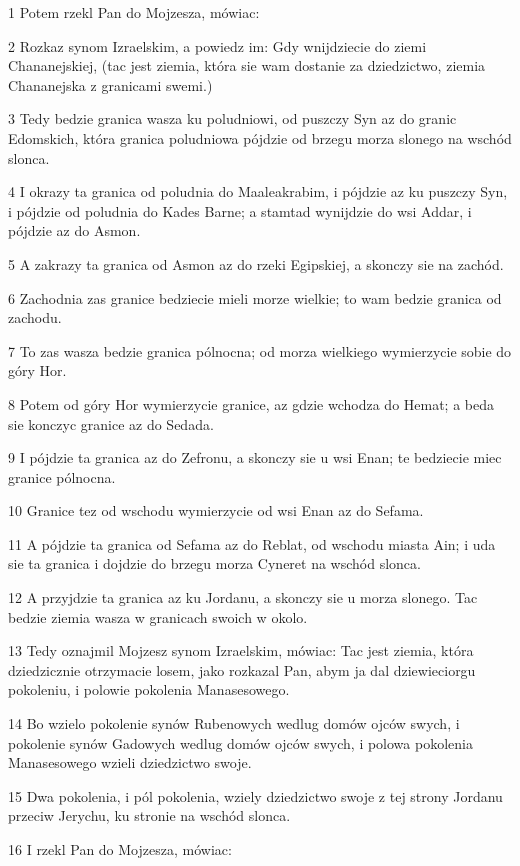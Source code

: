 \par 1 Potem rzekl Pan do Mojzesza, mówiac:
\par 2 Rozkaz synom Izraelskim, a powiedz im: Gdy wnijdziecie do ziemi Chananejskiej, (tac jest ziemia, która sie wam dostanie za dziedzictwo, ziemia Chananejska z granicami swemi.)
\par 3 Tedy bedzie granica wasza ku poludniowi, od puszczy Syn az do granic Edomskich, która granica poludniowa pójdzie od brzegu morza slonego na wschód slonca.
\par 4 I okrazy ta granica od poludnia do Maaleakrabim, i pójdzie az ku puszczy Syn, i pójdzie od poludnia do Kades Barne; a stamtad wynijdzie do wsi Addar, i pójdzie az do Asmon.
\par 5 A zakrazy ta granica od Asmon az do rzeki Egipskiej, a skonczy sie na zachód.
\par 6 Zachodnia zas granice bedziecie mieli morze wielkie; to wam bedzie granica od zachodu.
\par 7 To zas wasza bedzie granica pólnocna; od morza wielkiego wymierzycie sobie do góry Hor.
\par 8 Potem od góry Hor wymierzycie granice, az gdzie wchodza do Hemat; a beda sie konczyc granice az do Sedada.
\par 9 I pójdzie ta granica az do Zefronu, a skonczy sie u wsi Enan; te bedziecie miec granice pólnocna.
\par 10 Granice tez od wschodu wymierzycie od wsi Enan az do Sefama.
\par 11 A pójdzie ta granica od Sefama az do Reblat, od wschodu miasta Ain; i uda sie ta granica i dojdzie do brzegu morza Cyneret na wschód slonca.
\par 12 A przyjdzie ta granica az ku Jordanu, a skonczy sie u morza slonego. Tac bedzie ziemia wasza w granicach swoich w okolo.
\par 13 Tedy oznajmil Mojzesz synom Izraelskim, mówiac: Tac jest ziemia, która dziedzicznie otrzymacie losem, jako rozkazal Pan, abym ja dal dziewieciorgu pokoleniu, i polowie pokolenia Manasesowego.
\par 14 Bo wzielo pokolenie synów Rubenowych wedlug domów ojców swych, i pokolenie synów Gadowych wedlug domów ojców swych, i polowa pokolenia Manasesowego wzieli dziedzictwo swoje.
\par 15 Dwa pokolenia, i pól pokolenia, wziely dziedzictwo swoje z tej strony Jordanu przeciw Jerychu, ku stronie na wschód slonca.
\par 16 I rzekl Pan do Mojzesza, mówiac:
